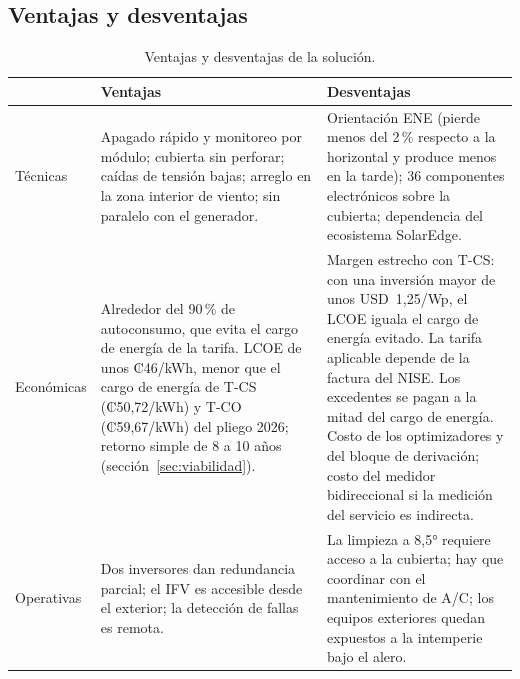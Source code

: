 \documentclass[12pt]{article}
\begin{document}
\subsection{Ventajas y desventajas}
\begin{table}[H]
\centering\small
\caption{Ventajas y desventajas de la solución.}\label{tab:vd}
\begin{tabularx}{\textwidth}{L{2.0cm}YY}
\toprule
& \textbf{Ventajas} & \textbf{Desventajas}\\
\midrule
Técnicas & Apagado rápido y monitoreo por módulo; cubierta sin perforar; caídas de tensión bajas; arreglo en la zona interior de viento; sin paralelo con el generador. & Orientación ENE (pierde menos del 2\,\% respecto a la horizontal y produce menos en la tarde); 36 componentes electrónicos sobre la cubierta; dependencia del ecosistema SolarEdge.\\
Económicas & Alrededor del 90\,\% de autoconsumo, que evita el cargo de energía de la tarifa. LCOE de unos ₡46/kWh, menor que el cargo de energía de T-CS (₡50,72/kWh) y T-CO (₡59,67/kWh) del pliego 2026; retorno simple de 8 a 10 años (sección~\ref{sec:viabilidad}). & Margen estrecho con T-CS: con una inversión mayor de unos USD~1,25/Wp, el LCOE iguala el cargo de energía evitado. La tarifa aplicable depende de la factura del NISE. Los excedentes se pagan a la mitad del cargo de energía. Costo de los optimizadores y del bloque de derivación; costo del medidor bidireccional si la medición del servicio es indirecta.\\
Operativas & Dos inversores dan redundancia parcial; el IFV es accesible desde el exterior; la detección de fallas es remota. & La limpieza a 8,5° requiere acceso a la cubierta; hay que coordinar con el mantenimiento de A/C; los equipos exteriores quedan expuestos a la intemperie bajo el alero.\\
\bottomrule
\end{tabularx}
\end{table}
\end{document}
